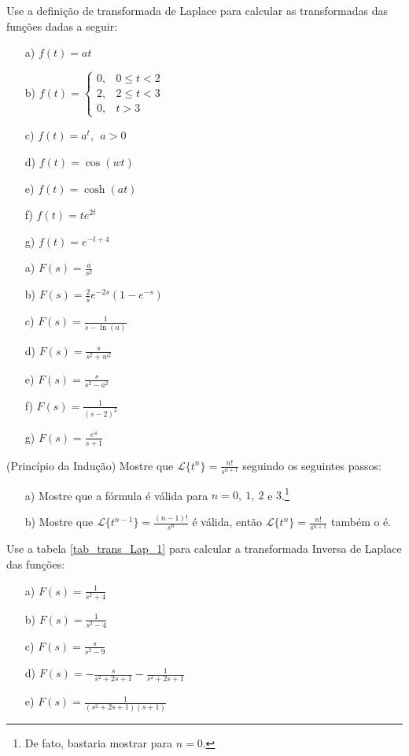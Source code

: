 \begin{Exercise}Use a definição de transformada de Laplace para calcular as transformadas das funções dadas a seguir:
 \begin{itemize}
  \item[a)] $f(t)=at$
  \item[b)] $f(t)=\left\{\begin{array}{ll}0, & 0\leq t< 2\\2,&  2\leq t< 3\\0,&t>3 \end{array}\right.$
  \item[c)] $f(t)=a^t,~~a>0$
  \item[d)] $f(t)=\cos(wt)$ 
  \item[e)] $f(t)=\cosh(at)$ 
  \item[f)] $f(t)=te^{2t}$ 
  \item[g)] $f(t)=e^{-t+4}$ 
 \end{itemize}
\end{Exercise}
\begin{resp}
 \begin{itemize}
  \item[a)] $F(s)=\frac{a}{s^2}$
  \item[b)] $F(s)=\frac{2}{s}e^{-2s}\left(1-e^{-s}\right)$ 
  \item[c)] $F(s)=\frac{1}{s-\ln(a)}$
  \item[d)] $F(s)=\frac{s}{s^2+w^2}$ 
  \item[e)] $F(s)=\frac{s}{s^2-a^2}$ 
  \item[f)] $F(s)=\frac{1}{(s-2)^2}$ 
  \item[g)] $F(s)=\frac{e^{4}}{s+1}$ 
  \end{itemize}
\end{resp}
 \begin{Exercise}\label{inducao_tn}(Princípio da Indução) Mostre que $\displaystyle\mathcal{L}\{t^n\}=\frac{n!}{s^{n+1}}$ seguindo os seguintes passos:
 \begin{itemize}
  \item[a)] Mostre que a fórmula é válida para $n=0,\ 1,\ 2$ e $3$.\footnote{De fato, bastaria mostrar para $n=0$.}
  \item[b)] Mostre que $\displaystyle\mathcal{L}\{t^{n-1}\}=\frac{(n-1)!}{s^{n}}$ é válida, então $\displaystyle\mathcal{L}\{t^n\}=\frac{n!}{s^{n+1}}$ também o é.
 \end{itemize}
 \end{Exercise}
 \begin{Exercise}Use a tabela \ref{tab_trans_Lap_1} para calcular a transformada Inversa de Laplace das funções:
 \begin{itemize}
  \item[a)] $F(s)=\frac{1}{s^2+4}$
  \item[b)] $F(s)=\frac{1}{s^2-4}$
  \item[c)] $F(s)=\frac{s}{s^2-9}$
  \item[d)] $F(s)=-\frac{s}{s^2+2s+1}-\frac{1}{s^2+2s+1}$ 
  \item[e)] $F(s)=\frac{1}{(s^2+2s+1)(s+1)}$ 
 \end{itemize}
\end{Exercise}
